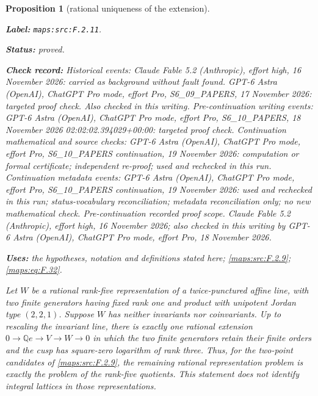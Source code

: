 \documentclass[11pt,a4paper]{article}
\newtheorem{proposition}[proposition]{Proposition}
\theoremstyle{definition}
\newcommand{\StatementRecord}[4]{\par\smallskip\begingroup\upshape\raggedright\noindent\textbf{Label:} \nolinkurl{#1}.\par\noindent\textbf{Status:} #2.\par\noindent\textbf{Check record:} #3.\par\noindent\textbf{Uses:} #4.\par\endgroup\smallskip}
\begin{document}
\begin{proposition}[rational uniqueness of the extension]\label{maps:src:F.2.11}
\StatementRecord{maps:src:F.2.11}{proved}{Historical events: Claude Fable 5.2 (Anthropic), effort high, 16 November 2026: carried as background without fault found. GPT-6 Astra (OpenAI), ChatGPT Pro mode, effort Pro, S6\_09\_PAPERS, 17 November 2026: targeted proof check. Also checked in this writing. Pre-continuation writing events: GPT-6 Astra (OpenAI), ChatGPT Pro mode, effort Pro, S6\_10\_PAPERS, 18 November 2026 02:02:02.394029+00:00: targeted proof check. Continuation mathematical and source checks: GPT-6 Astra (OpenAI), ChatGPT Pro mode, effort Pro, S6\_10\_PAPERS continuation, 19 November 2026: computation or formal certificate; independent re-proof; used and rechecked in this run. Continuation metadata events: GPT-6 Astra (OpenAI), ChatGPT Pro mode, effort Pro, S6\_10\_PAPERS continuation, 19 November 2026: used and rechecked in this run; status-vocabulary reconciliation; metadata reconciliation only; no new mathematical check. \emph{Pre-continuation recorded proof scope.} Claude Fable 5.2 (Anthropic), effort high, 16 November 2026; also checked in this writing by GPT-6 Astra (OpenAI), ChatGPT Pro mode, effort Pro, 18 November 2026}{the hypotheses, notation and definitions stated here; \cref{maps:src:F.2.9}; \cref{maps:eq:F.32}}


Let $W$ be a rational rank-five representation of a
twice-punctured affine line, with two finite generators
having fixed rank one and product with unipotent Jordan type
$(2,2,1)$.  Suppose $W$ has neither invariants nor
coinvariants.  Up to rescaling the invariant line, there is
exactly one rational extension
$0\to\mathbb Qe\to V\to W\to0$ in which the two finite
generators retain their finite orders and the cusp has
square-zero logarithm of rank three.  Thus, for the
two-point candidates of \ref{maps:src:F.2.9}, the remaining rational
representation problem is exactly the problem of the
rank-five quotients.  This statement does not identify
integral lattices in those representations.

\end{proposition}
\end{document}
